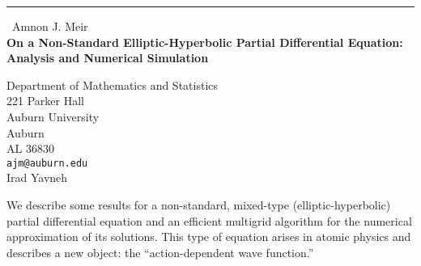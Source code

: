 \documentclass{report}
\begin{document}
\begin{center}
\rule{6in}{1pt} \
{\large Amnon J. Meir \\
{\bf On a Non-Standard Elliptic-Hyperbolic Partial Differential Equation: Analysis and Numerical Simulation}}

Department of Mathematics and Statistics \\ 221 Parker Hall \\ Auburn University \\ Auburn \\ AL 36830
\\
{\tt ajm@auburn.edu}\\
Irad Yavneh\end{center}

We describe some results for a non-standard, mixed-type
(elliptic-hyperbolic) partial differential equation and an efficient
multigrid algorithm for the numerical approximation of its solutions.
This type of equation arises in atomic physics and describes a new
object: the ``action-dependent wave function.''
\end{document}
